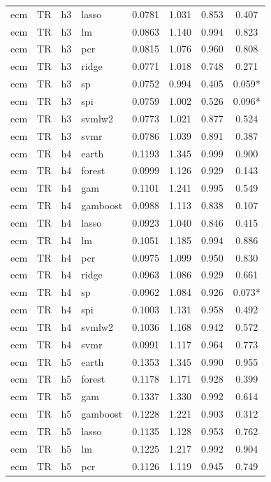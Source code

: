 \begin{ThreePartTable}
\begin{longtable}[t]{llclcccc}
ecm & TR & h3 & lasso & 0.0781 & 1.031 & 0.853 & 0.407\\
ecm & TR & h3 & lm & 0.0863 & 1.140 & 0.994 & 0.823\\
ecm & TR & h3 & pcr & 0.0815 & 1.076 & 0.960 & 0.808\\
ecm & TR & h3 & ridge & 0.0771 & 1.018 & 0.748 & 0.271\\
ecm & TR & h3 & sp & 0.0752 & 0.994 & 0.405 & 0.059*\\
ecm & TR & h3 & spi & 0.0759 & 1.002 & 0.526 & 0.096*\\
ecm & TR & h3 & svmlw2 & 0.0773 & 1.021 & 0.877 & 0.524\\
ecm & TR & h3 & svmr & 0.0786 & 1.039 & 0.891 & 0.387\\
\addlinespace
ecm & TR & h4 & earth & 0.1193 & 1.345 & 0.999 & 0.900\\
ecm & TR & h4 & forest & 0.0999 & 1.126 & 0.929 & 0.143\\
ecm & TR & h4 & gam & 0.1101 & 1.241 & 0.995 & 0.549\\
ecm & TR & h4 & gamboost & 0.0988 & 1.113 & 0.838 & 0.107\\
ecm & TR & h4 & lasso & 0.0923 & 1.040 & 0.846 & 0.415\\
ecm & TR & h4 & lm & 0.1051 & 1.185 & 0.994 & 0.886\\
ecm & TR & h4 & pcr & 0.0975 & 1.099 & 0.950 & 0.830\\
ecm & TR & h4 & ridge & 0.0963 & 1.086 & 0.929 & 0.661\\
ecm & TR & h4 & sp & 0.0962 & 1.084 & 0.926 & 0.073*\\
ecm & TR & h4 & spi & 0.1003 & 1.131 & 0.958 & 0.492\\
ecm & TR & h4 & svmlw2 & 0.1036 & 1.168 & 0.942 & 0.572\\
ecm & TR & h4 & svmr & 0.0991 & 1.117 & 0.964 & 0.773\\
\addlinespace
ecm & TR & h5 & earth & 0.1353 & 1.345 & 0.990 & 0.955\\
ecm & TR & h5 & forest & 0.1178 & 1.171 & 0.928 & 0.399\\
ecm & TR & h5 & gam & 0.1337 & 1.330 & 0.992 & 0.614\\
ecm & TR & h5 & gamboost & 0.1228 & 1.221 & 0.903 & 0.312\\
ecm & TR & h5 & lasso & 0.1135 & 1.128 & 0.953 & 0.762\\
ecm & TR & h5 & lm & 0.1225 & 1.217 & 0.992 & 0.904\\
ecm & TR & h5 & pcr & 0.1126 & 1.119 & 0.945 & 0.749\\

\end{longtable}
\end{ThreePartTable}
